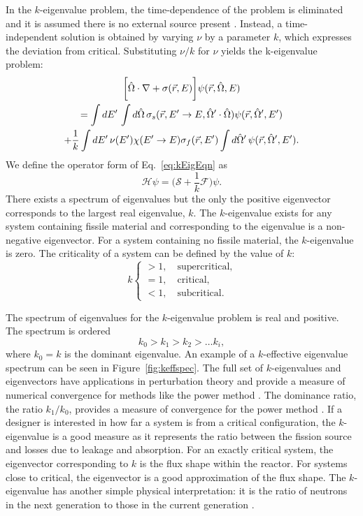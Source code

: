 In the $k$-eigenvalue problem, the time-dependence of the problem is eliminated and it is assumed there is no external source present \cite{bell_nuclear_1970}. Instead, a time-independent solution is obtained by varying $\nu$ by a parameter $k$, which expresses the deviation from critical. Substituting $\nu/k$ for $\nu$ yields the k-eigenvalue problem: 
\begin{multline}
	\bigg [ \hat{\Omega} \cdot \nabla + \sigma(\vec{r},E) \bigg ] \psi(\vec{r},\hat{\Omega},E) \\ = \int \mathop{}\!d E' \, \int \mathop{}\!d \hat{\Omega} \, \sigma_{s}(\vec{r},E'\rightarrow E,\hat{\Omega}' \cdot \hat{\Omega}) \psi(\vec{r},\hat{\Omega}',E') \\ + \frac{1}{k} \int \mathop{}\!d E' \, \nu(E') \chi(E'\rightarrow E) \sigma_{f}(\vec{r},E') \int \mathop{}\!d \hat{\Omega}' \, \psi(\vec{r},\hat{\Omega}',E').
	\label{eq:kEigEqn}
\end{multline}
We define the operator form of Eq.~\ref{eq:kEigEqn} as
\begin{equation}
\mathcal{H} \psi = \bigg ( \mathcal{S} + \frac{1}{k}\mathcal{F} \bigg ) \psi.
\label{eq:OpFormk}
\end{equation}
There exists a spectrum of eigenvalues but the only the positive eigenvector corresponds to the largest real eigenvalue, $k$. The $k$-eigenvalue exists for any system containing fissile material and corresponding to the eigenvalue is a non-negative eigenvector. For a system containing no fissile material, the $k$-eigenvalue is zero. The criticality of a system can be defined by the value of $k$:
	$$ k \begin{cases}						  			  			 > 1, \quad \text{supercritical,} \\			 			 			= 1, \quad \text{critical,} \\
					 < 1, \quad \text{subcritical.} 				       \end{cases} $$

The spectrum of eigenvalues for the $k$-eigenvalue problem is real and positive. The spectrum is ordered
\begin{equation}
	k_{0} > k_{1} > k_{2} > \dots k_{i},
\end{equation}
where $k_{0} = k$ is the dominant eigenvalue. An example of a $k$-effective eigenvalue spectrum can be seen in Figure~\ref{fig:keffspec}. The full set of $k$-eigenvalues and eigenvectors have applications in perturbation theory and provide a measure of numerical convergence for methods like the power method \cite{lewis_computational_1984}. The dominance ratio, the ratio $k_{1}/k_{0}$, provides a measure of convergence for the power method \cite{lewis_computational_1984}. If a designer is interested in how far a system is from a critical configuration, the $k$-eigenvalue is a good measure as it represents the ratio between the fission source and losses due to leakage and absorption. For an exactly critical system, the eigenvector corresponding to $k$ is the flux shape within the reactor. For systems close to critical, the eigenvector is a good approximation of the flux shape. The $k$-eigenvalue has another simple physical interpretation: it is the ratio of neutrons in the next generation to those in the current generation \cite{ronen_comparison_1976}.

